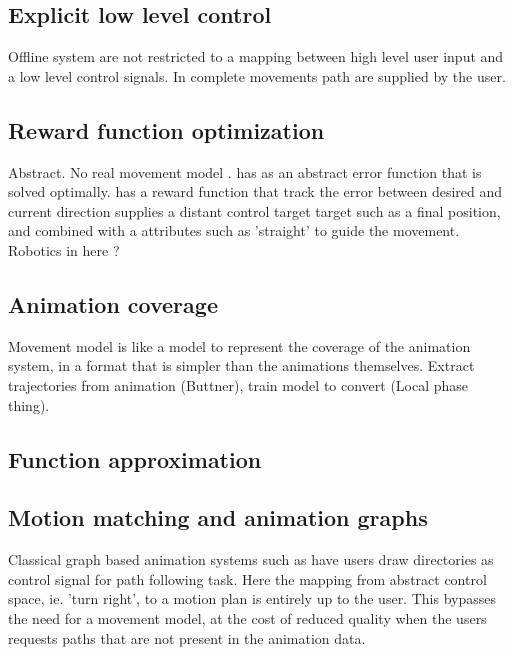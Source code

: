 \subsection{Explicit low level control}
Offline system are not restricted to a mapping between high level user input and a low level control signals. In \citep{treuille07} complete movements path are supplied by the user.

\subsection{Reward function optimization}
Abstract. No real movement model .
\citep{kovar02} has as an abstract error function that is solved optimally.
\citep{lee10} has a reward function that track the error between desired and current direction
\citep{lee18} supplies a distant control target target such as a final position, and combined with a attributes such as 'straight' to guide the movement.
Robotics in here ?

\subsection{Animation coverage}
Movement model is like  a model to represent the coverage of the animation system, in a format that is simpler than the animations themselves. Extract trajectories from animation (Buttner), train model to convert (Local phase thing). 

\subsection{Function approximation}


\subsection{Motion matching and animation graphs}
Classical graph based animation systems such as \citep{treuille07} have users draw directories as control signal for path following task. Here the mapping from abstract control space, ie. 'turn right', to a motion plan is entirely up to the user. This bypasses the need for a movement model, at the cost of reduced quality when the users requests paths that are not present in the animation data.





